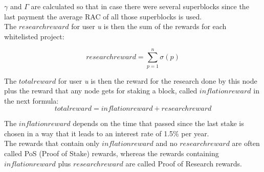$\gamma$ and $\Gamma$ are calculated so that in case there were several superblocks since the last payment the average RAC of all those superblocks is used.\\

The $researchreward$ for user \textit{u} is then the sum of the rewards for each whitelisted project:

\[ researchreward = \sum_{p=1}^{n} \sigma(p) \]


The $totalreward$  for user \textit{u} is then the reward for the research done by this node plus the reward that any node gets for staking a block, called $inflationreward$ in the next formula:
\[ totalreward = inflationreward +  researchreward \]

The $inflationreward$ depends on the time that passed since the last stake is chosen in a way that it leads to an interest rate of 1.5\% per year.\\

The rewards that contain only $inflationreward$ and no $researchreward$
are often called PoS (Proof of Stake) rewards, whereas the rewards containing $inflationreward$ plus $researchreward$ are called Proof of Research rewards.
